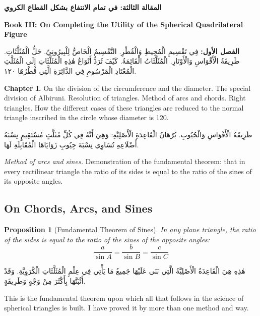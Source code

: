\documentclass[11pt,a4paper]{article}
\theoremstyle{plain}
\newtheorem{proposition}{Proposition}[section]
\theoremstyle{definition}
\theoremstyle{remark}
\newcommand{\ar}[1]{{\arabicfont\beginR #1\endR}}
\newcommand{\bilingualpair}[2]{%
  \par\noindent
  \begin{minipage}[t]{0.48\textwidth}
  #1
  \end{minipage}%
  \hfill
  \begin{minipage}[t]{0.48\textwidth}
  \vspace*{0pt}#2
  \end{minipage}\par\vspace{0.3cm}%
}
\begin{document}
\bilingualpair{\noindent\textcolor{arabicblue}{\textbf{\ar{المقالة الثالثة: في تمام الانتفاع بشكل القطاع الكروي}}}}{\noindent\textcolor{sectioncolor}{\textbf{Book III: On Completing the Utility of the Spherical Quadrilateral Figure}}}

\vspace{0.3cm}

\bilingualpair{\ar{\textbf{الفصل الأول:} فِي تَقْسِيمِ الْمُحِيطِ وَالْقُطْرِ. التَّقْسِيمُ الْخَاصُّ لِلْبِيرُونِيّ. حَلُّ الْمُثَلَّثَاتِ. طَرِيقَةُ الْأَقْوَاسِ وَالْأَوْتَارِ. الْمُثَلَّثَاتُ الْقَائِمَةُ. كَيْفَ تُرَدُّ أَنْوَاعُ هٰذِهِ الْمُثَلَّثَاتِ إِلَى الْمُثَلَّثِ الْمُعْتَادِ الْمَرْسُومِ فِي الدَّائِرَةِ الَّتِي قُطْرُهَا ١٢٠.}}{\noindent\textbf{Chapter I.} On the division of the circumference and the diameter. The special division of Albiruni. Resolution of triangles. Method of arcs and chords. Right triangles. How the different cases of these triangles are reduced to the normal triangle inscribed in the circle whose diameter is 120.}

\vspace{0.3cm}

\bilingualpair{\ar{طَرِيقَةُ الْأَقْوَاسِ وَالْجُيُوبِ. بُرْهَانُ الْقَاعِدَةِ الْأَصْلِيَّةِ: وَهِيَ أَنَّهُ فِي كُلِّ مُثَلَّثٍ مُسْتَقِيمٍ نِسْبَةُ أَضْلَاعِهِ تُسَاوِي نِسْبَةَ جِيُوبِ زَوَايَاهَا الْمُقَابِلَةِ لَهَا.}}{\textit{Method of arcs and sines.} Demonstration of the fundamental theorem: that in every rectilinear triangle the ratio of its sides is equal to the ratio of the sines of its opposite angles.}

\vspace{0.5cm}

\subsection{On Chords, Arcs, and Sines}
\label{sec:chords-arcs}

\begin{proposition}[Fundamental Theorem of Sines]
In any plane triangle, the ratio of the sides is equal to the ratio of the sines of the opposite angles:
\[
\frac{a}{\sin A} = \frac{b}{\sin B} = \frac{c}{\sin C}
\]
\end{proposition}

\vspace{0.3cm}

\bilingualpair{\ar{هٰذِهِ هِيَ الْقَاعِدَةُ الْأَصْلِيَّةُ الَّتِي بَنَى عَلَيْهَا جَمِيعُ مَا يَأْتِي فِي عِلْمِ الْمُثَلَّثَاتِ الْكُرَوِيَّةِ. وَقَدْ أَثْبَتَّهَا بِأَكْثَرَ مِنْ وَجْهٍ وَطَرِيقَةٍ.}}{This is the fundamental theorem upon which all that follows in the science of spherical triangles is built. I have proved it by more than one method and way.}
\end{document}
